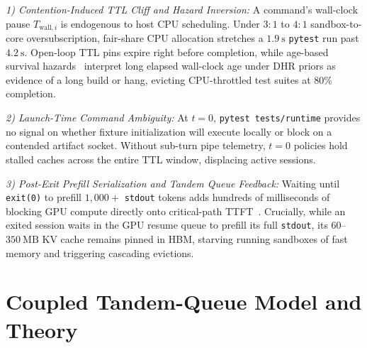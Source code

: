 \documentclass[10pt,journal,compsoc]{IEEEtran}
\theoremstyle{definition}
\theoremstyle{remark}
\begin{document}
\emph{1) Contention-Induced TTL Cliff and Hazard Inversion:} A command's wall-clock pause $T_{\mathrm{wall},i}$ is endogenous to host CPU scheduling. Under $3{:}1$ to $4{:}1$ sandbox-to-core oversubscription, fair-share CPU allocation stretches a $1.9~\mathrm{s}$ \texttt{pytest} run past $4.2~\mathrm{s}$. Open-loop TTL pins expire right before completion, while age-based survival hazards~\cite{he2026unison} interpret long elapsed wall-clock age under DHR priors as evidence of a long build or hang, evicting CPU-throttled test suites at $80\%$ completion.

\emph{2) Launch-Time Command Ambiguity:} At $t = 0$, \texttt{pytest tests/runtime} provides no signal on whether fixture initialization will execute locally or block on a contended artifact socket. Without sub-turn pipe telemetry, $t = 0$ policies hold stalled caches across the entire TTL window, displacing active sessions.

\emph{3) Post-Exit Prefill Serialization and Tandem Queue Feedback:} Waiting until \texttt{exit(0)} to prefill $1{,}000+$ \texttt{stdout} tokens adds hundreds of milliseconds of blocking GPU compute directly onto critical-path TTFT~\cite{agrawal2024sarathi,zhong2024distserve}. Crucially, while an exited session waits in the GPU resume queue to prefill its full \texttt{stdout}, its $60$--$350~\mathrm{MB}$ KV cache remains pinned in HBM, starving running sandboxes of fast memory and triggering cascading evictions.

\section{Coupled Tandem-Queue Model and Theory}\label{sec:theory}
\end{document}
